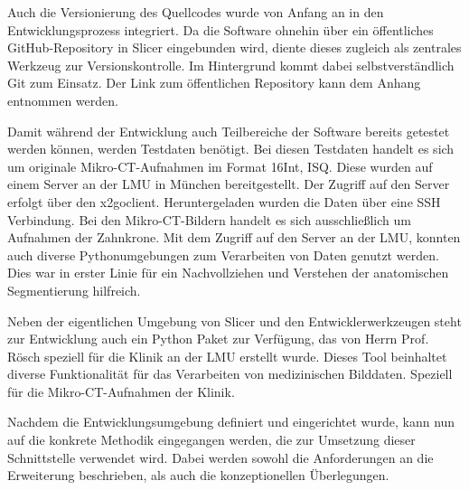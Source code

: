 Auch die Versionierung des Quellcodes wurde von Anfang an in den Entwicklungsprozess
integriert. Da die Software ohnehin über ein öffentliches GitHub-Repository in
Slicer eingebunden wird, diente dieses zugleich als zentrales Werkzeug zur Versionskontrolle.
Im Hintergrund kommt dabei selbstverständlich Git zum Einsatz. Der Link zum öffentlichen
Repository kann dem Anhang entnommen werden.

Damit während der Entwicklung auch Teilbereiche der Software bereits getestet werden
können, werden Testdaten benötigt. Bei diesen Testdaten handelt es sich um originale
Mikro-\ac{CT}-Aufnahmen im Format \ac{16Int}, \ac{ISQ}. Diese wurden auf einem
Server an der \ac{LMU} in München bereitgestellt. Der Zugriff auf den Server
erfolgt über den x2goclient. Heruntergeladen wurden die Daten über eine \ac{SSH}
Verbindung. Bei den Mikro-\ac{CT}-Bildern handelt es sich ausschließlich um
Aufnahmen der Zahnkrone. Mit dem Zugriff auf den Server an der \ac{LMU}, konnten
auch diverse Pythonumgebungen zum Verarbeiten von Daten genutzt werden. Dies war
in erster Linie für ein Nachvollziehen und Verstehen der anatomischen
Segmentierung hilfreich.

Neben der eigentlichen Umgebung von Slicer und den Entwicklerwerkzeugen steht
zur Entwicklung auch ein Python Paket zur Verfügung, das von Herrn Prof. Rösch
speziell für die Klinik an der \ac{LMU} erstellt wurde. Dieses Tool beinhaltet
diverse Funktionalität für das Verarbeiten von medizinischen Bilddaten. Speziell
für die Mikro-\ac{CT}-Aufnahmen der Klinik.

Nachdem die Entwicklungsumgebung definiert und eingerichtet wurde, kann nun auf die
konkrete Methodik eingegangen werden, die zur Umsetzung dieser Schnittstelle
verwendet wird. Dabei werden sowohl die Anforderungen an die Erweiterung beschrieben,
als auch die konzeptionellen Überlegungen.

